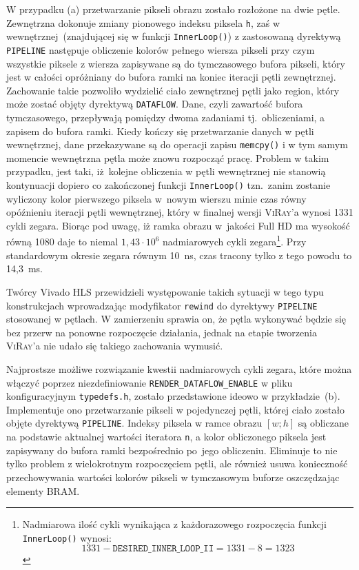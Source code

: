 \begin{enumerate}
\begin{enumerate}
\end{enumerate}
W przypadku (a) przetwarzanie pikseli obrazu zostało rozłożone na dwie pętle. Zewnętrzna dokonuje zmiany pionowego indeksu piksela \texttt{h}, zaś w wewnętrznej~(znajdującej się w funkcji \texttt{InnerLoop()}) z zastosowaną dyrektywą \texttt{PIPELINE} następuje obliczenie kolorów pełnego wiersza pikseli przy czym wszystkie piksele z wiersza zapisywane są do tymczasowego bufora pikseli, który jest w całości opróżniany do bufora ramki na koniec iteracji pętli zewnętrznej. Zachowanie takie pozwoliło wydzielić ciało zewnętrznej pętli jako region, który może zostać objęty dyrektywą \texttt{DATAFLOW}. Dane, czyli zawartość bufora tymczasowego, przepływają pomiędzy dwoma zadaniami tj.~obliczeniami, a zapisem do bufora ramki. Kiedy kończy się przetwarzanie danych w pętli wewnętrznej, dane przekazywane są do operacji zapisu \texttt{memcpy()} i w tym samym momencie wewnętrzna pętla może znowu rozpocząć pracę. Problem w takim przypadku, jest taki, iż~kolejne obliczenia w pętli wewnętrznej nie stanowią kontynuacji dopiero co zakończonej funkcji \texttt{InnerLoop()} tzn.~zanim zostanie wyliczony kolor pierwszego piksela w~nowym wierszu minie czas równy opóźnieniu iteracji pętli wewnętrznej, który w finalnej wersji \textsc{ViRay}'a wynosi 1331 cykli zegara. Biorąc pod uwagę, iż ramka obrazu w~jakości Full HD ma wysokość równą 1080 daje to niemal $1,43\cdot 10^6$ nadmiarowych cykli zegara\footnote{Nadmiarowa ilość cykli wynikająca z każdorazowego rozpoczęcia funkcji \texttt{InnerLoop()} wynosi: 
\begin{equation}
1331 - \mathtt{DESIRED\_INNER\_LOOP\_II} = 1331 - 8 = 1323\nonumber
\end{equation}
}. Przy standardowym okresie zegara równym 10~ns, czas tracony tylko z tego powodu to 14,3~ms. 

Twórcy Vivado HLS przewidzieli występowanie takich sytuacji w tego typu konstrukcjach wprowadzając modyfikator \texttt{rewind} do dyrektywy \texttt{PIPELINE} stosowanej w pętlach. W zamierzeniu sprawia on, że pętla wykonywać będzie się bez przerw na ponowne rozpoczęcie działania, jednak na etapie tworzenia \textsc{ViRay}'a nie udało się takiego zachowania wymusić.

Najprostsze możliwe rozwiązanie kwestii nadmiarowych cykli zegara, które można włączyć poprzez niezdefiniowanie \texttt{RENDER\_DATAFLOW\_ENABLE} w pliku konfiguracyjnym \texttt{typedefs.h}, zostało przedstawione ideowo w przykładzie~(b). Implementuje ono przetwarzanie pikseli w pojedynczej pętli, której ciało zostało objęte dyrektywą \texttt{PIPELINE}. Indeksy piksela w ramce obrazu $[w;h]$ są obliczane na podstawie aktualnej wartości iteratora \texttt{n}, a kolor obliczonego piksela jest zapisywany do bufora ramki bezpośrednio po~jego obliczeniu. Eliminuje to nie tylko problem z wielokrotnym rozpoczęciem pętli, ale również usuwa konieczność przechowywania wartości kolorów pikseli w tymczasowym buforze oszczędzając elementy BRAM. 


\end{enumerate}
